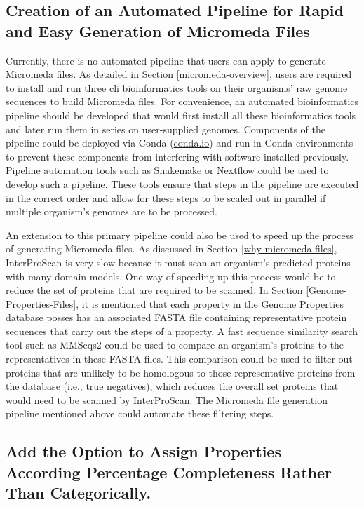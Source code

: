 \subsection{Creation of an Automated Pipeline for Rapid and Easy Generation of Micromeda Files} \label{pipeline-development}

Currently, there is no automated pipeline that users can apply to generate Micromeda files. As detailed in Section \ref{micromeda-overview}, users are required to install and run three \gls{cli} bioinformatics tools on their organisms' raw genome sequences to build Micromeda files. For convenience, an automated bioinformatics pipeline should be developed that would first install all these bioinformatics tools and later run them in series on user-supplied genomes. Components of the pipeline could be deployed via Conda (\href{conda.io}{conda.io}) and run in Conda environments to prevent these components from interfering with software installed previously. Pipeline automation tools such as Snakemake \cite{koster2012snakemake} or Nextflow \cite{di2017nextflow} could be used to develop such a pipeline. These tools ensure that steps in the pipeline are executed in the correct order and allow for these steps to be scaled out in parallel if multiple organism's genomes are to be processed.

An extension to this primary pipeline could also be used to speed up the process of generating Micromeda files. As discussed in Section \ref{why-micromeda-files}, InterProScan is very slow because it must scan an organism's predicted proteins with many domain models. One way of speeding up this process would be to reduce the set of proteins that are required to be scanned. In Section \ref{Genome-Properties-Files}, it is mentioned that each property in the Genome Properties database posses has an associated FASTA file containing representative protein sequences that carry out the steps of a property. A fast sequence similarity search tool such as MMSeqs2 \cite{steinegger2017mmseqs2} could be used to compare an organism's proteins to the representatives in these FASTA files. This comparison could be used to filter out proteins that are unlikely to be homologous to those representative proteins from the database (i.e., true negatives), which reduces the overall set proteins that would need to be scanned by InterProScan. The Micromeda file generation pipeline mentioned above could automate these filtering steps.

\subsection{Add the Option to Assign Properties According Percentage Completeness Rather Than Categorically.}

